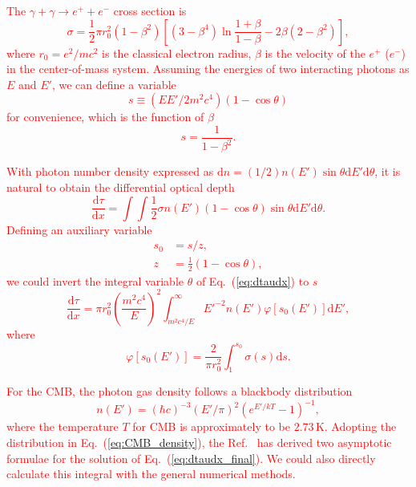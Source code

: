 \documentclass[12pt,aps,prd,amsmath,amssymb,showpacs,floats,floatfix,nofootinbib]{revtex4-1}
\def\red#1{{\textcolor{red}{#1}}} %
\begin{document}
\red{
The $\gamma+\gamma\rightarrow e^++e^-$ cross section is
\begin{equation}
  \sigma = \frac{1}{2}\pi r_0^2(1-\beta^2)\left[ (3-\beta^4)\ln\frac{1+\beta}{1-\beta}-2\beta(2-\beta^2) \right],
  \label{eq:cross_section}
\end{equation}
where $r_0=e^2/mc^2$ is the classical electron radius, $\beta$ is the velocity of the $e^+$ ($e^-$)  in the center-of-mass system.
Assuming the energies of two interacting photons as $E$ and $E'$, we can define a variable
\begin{equation}
  s\equiv (EE'/2m^2c^4)(1-\cos\theta)
  \label{eq:s_variable}
\end{equation}
for convenience, which is the function of $\beta$
\begin{equation}
  s = \frac{1}{1-\beta^2}.
  \label{eq:s_beta}
\end{equation}
}

\red{
With photon number density expressed as $\mathrm{d}n=(1/2)n(E')\sin\theta\mathrm{d}E'\mathrm{d}\theta$, it is natural to obtain the differential optical depth
\begin{equation}
  \frac{\mathrm{d}\tau}{\mathrm{d}x}=\int\int\frac{1}{2}\sigma n(E')(1-\cos\theta)\sin\theta\mathrm{d}E'\mathrm{d}\theta.
  \label{eq:dtaudx}
\end{equation}
Defining an auxiliary variable
\begin{equation}
  \begin{aligned}
  s_0 &= s / z, \\
  z &= \frac{1}{2}(1-\cos\theta),
  \end{aligned}
  \label{eq:s0}
\end{equation}
we could invert the integral variable $\theta$ of Eq.~(\ref{eq:dtaudx}) to $s$
\begin{equation}
  \frac{\mathrm{d}\tau}{\mathrm{d}x}=\pi r_0^2\left( \frac{m^2c^4}{E} \right)^2\int^\infty_{m^2c^4/E}E'^{-2}n(E')\varphi\left[ s_0(E') \right]\mathrm{d}E',
  \label{eq:dtaudx_final}
\end{equation}
where
\begin{equation}
  \varphi\left[ s_0(E') \right] = \frac{2}{\pi r_0^2}\int_{1}^{s_0}\sigma(s)\mathrm{d}s.
  \label{eq:phi_bar}
\end{equation}
}

\red{
For the CMB, the photon gas density follows a blackbody distribution
\begin{equation}
  n(E') = (\hbar c)^{-3}(E'/\pi)^2\left( e^{E'/kT}-1 \right)^{-1},
  \label{eq:CMB_density}
\end{equation}
where the temperature $T$ for CMB is approximately to be $2.73\,\mathrm{K}$.
Adopting the distribution in Eq.~(\ref{eq:CMB_density}), the Ref.~\cite{Gould:1967zzb} has derived two asymptotic formulae for the solution of Eq.~(\ref{eq:dtaudx_final}).
We could also directly calculate this integral with the general numerical methods.
}
\end{document}
